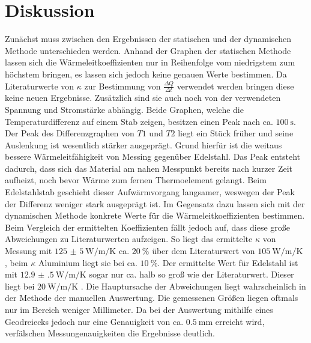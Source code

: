 
\section{Diskussion}
\label{sec:Diskussion}
Zunächst muss zwischen den Ergebnissen der statischen und der dynamischen Methode
 unterschieden werden. Anhand der Graphen der statischen Methode lassen sich
 die Wärmeleitkoeffizienten nur in Reihenfolge vom niedrigstem zum höchstem bringen,
 es lassen sich jedoch keine genauen Werte bestimmen. Da Literaturwerte
 von $\kappa$ zur Bestimmung von $\frac{\Delta Q}{\Delta t}$ verwendet werden
 bringen diese keine neuen Ergebnisse. Zusätzlich sind sie auch noch von der
 verwendeten Spannung und Stromstärke abhängig. Beide Graphen, welche die
 Temperaturdifferenz auf einem Stab zeigen, besitzen einen Peak nach
 ca. $\SI{100}{\second}$. Der Peak des Differenzgraphen von $T1$ und $T2$ 
liegt ein Stück früher und seine Auslenkung ist wesentlich stärker ausgeprägt. Grund hierfür ist die  weitaus bessere
 Wärmeleitfähigkeit von Messing gegenüber Edelstahl. Das Peak entsteht dadurch, dass sich das
 Material am nahen Messpunkt bereits nach kurzer Zeit aufheizt, noch bevor Wärme zum fernen Thermoelement gelangt. Beim Edelstahlstab geschieht
 dieser Aufwärmvorgang langsamer, weswegen der Peak der Differenz weniger stark ausgeprägt ist. Im
 Gegensatz dazu lassen sich mit der dynamischen Methode konkrete Werte für die
 Wärmeleitkoeffizienten bestimmen. Beim Vergleich der ermittelten Koeffizienten
  fällt jedoch auf, dass diese große Abweichungen zu Literaturwerten \cite{km} aufzeigen.
  So liegt das ermittelte $\kappa$ von Messung mit
  $\SI{125(5)}{\watt\per\meter\per\kelvin}$ ca. $\SI{20}{\percent}$ über
  dem Literaturwert von $\SI{105}{\watt\per\meter\per\kelvin}$ \cite{km}, beim $\kappa$
  Aluminium liegt sie bei ca. $\SI{10}{\percent}$. Der ermittelte Wert für
  Edelstahl ist mit $\SI{12.9(5)}{\watt\per\meter\per\kelvin}$ sogar
   nur ca. halb so groß wie der Literaturwert. Dieser liegt bei $\SI{20}{\watt\per\meter\per\kelvin}$ \cite{km}.
   Die Hauptursache der Abweichungen liegt wahrscheinlich in der Methode der manuellen
   Auswertung. Die gemessenen Größen liegen oftmals nur im Bereich weniger Millimeter.
   Da bei der Auswertung mithilfe eines Geodreiecks jedoch nur eine
   Genauigkeit von ca. $\SI{0.5}{\milli\meter}$ erreicht wird, verfälschen
   Messungenauigkeiten die Ergebnisse deutlich.
